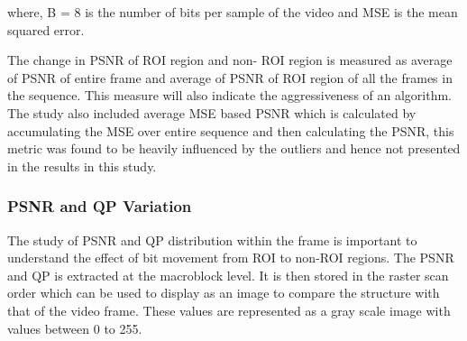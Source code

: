\documentclass[11pt]{article} %
\begin{document}
where, B = 8 is the number of bits per sample of the video and MSE is the mean squared error.

 The change in PSNR of ROI region and non- ROI region is measured as average of PSNR of entire frame and average of PSNR of ROI region of all the frames in the sequence. This measure will also indicate the aggressiveness of an algorithm. The study also included average MSE based PSNR which is calculated by accumulating the MSE over entire sequence and then calculating the PSNR, this metric was found to be heavily influenced by the outliers and hence not presented in the results in this study.
\subsubsection{PSNR and QP Variation}
The study of PSNR and QP distribution within the frame is important to understand the effect of bit movement from ROI to non-ROI regions. The PSNR and QP is extracted at the macroblock level. It is then stored in the raster scan order which can be used to display as  an image to compare the structure with that of the video frame. These values are represented as a gray scale image with values between 0 to 255. 
\end{document}
